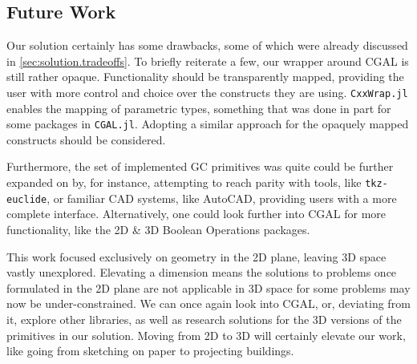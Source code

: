 \subsection*{Future Work}

Our solution certainly has some drawbacks, some of which were already discussed
in \cref{sec:solution.tradeoffs}.  To briefly reiterate a few, our wrapper
around \ac{CGAL} is still rather opaque.  Functionality should be transparently
mapped, providing the user with more control and choice over the constructs they
are using.  \texttt{CxxWrap.jl} enables the mapping of parametric types,
something that was done in part for some packages in \texttt{CGAL.jl}.  Adopting
a similar approach for the opaquely mapped constructs should be considered.

Furthermore, the set of implemented \ac{GC} primitives was quite could be
further expanded on by, for instance, attempting to reach parity with tools,
like \texttt{tkz-euclide}, or familiar \ac{CAD} systems, like AutoCAD, providing
users with a more complete interface.  Alternatively, one could look further
into \ac{CGAL} for more functionality, like the 2D \& 3D Boolean Operations
packages.

This work focused exclusively on geometry in the 2D plane, leaving 3D space
vastly unexplored.  Elevating a dimension means the solutions to problems once
formulated in the 2D plane are not applicable in 3D space for some problems may
now be under-constrained.  We can once again look into \ac{CGAL}, or, deviating
from it, explore other libraries, as well as research solutions for the 3D
versions of the primitives in our solution. Moving from 2D to 3D will certainly
elevate our work, like going from sketching on paper to projecting buildings.
